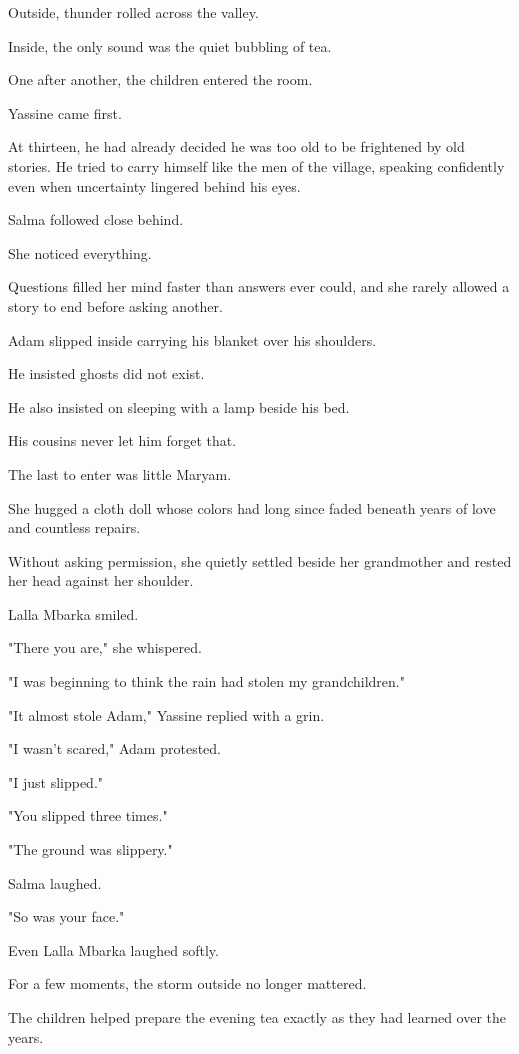 \documentclass[12pt,openany]{book}
\begin{document}
Outside, thunder rolled across the valley.

Inside, the only sound was the quiet bubbling of tea.

One after another, the children entered the room.

Yassine came first.

At thirteen, he had already decided he was too old to be frightened by old stories. He tried to carry himself like the men of the village, speaking confidently even when uncertainty lingered behind his eyes.

Salma followed close behind.

She noticed everything.

Questions filled her mind faster than answers ever could, and she rarely allowed a story to end before asking another.

Adam slipped inside carrying his blanket over his shoulders.

He insisted ghosts did not exist.

He also insisted on sleeping with a lamp beside his bed.

His cousins never let him forget that.

The last to enter was little Maryam.

She hugged a cloth doll whose colors had long since faded beneath years of love and countless repairs.

Without asking permission, she quietly settled beside her grandmother and rested her head against her shoulder.

Lalla Mbarka smiled.

"There you are," she whispered.

"I was beginning to think the rain had stolen my grandchildren."

"It almost stole Adam," Yassine replied with a grin.

"I wasn't scared," Adam protested.

"I just slipped."

"You slipped three times."

"The ground was slippery."

Salma laughed.

"So was your face."

Even Lalla Mbarka laughed softly.

For a few moments, the storm outside no longer mattered.

The children helped prepare the evening tea exactly as they had learned over the years.
\end{document}
